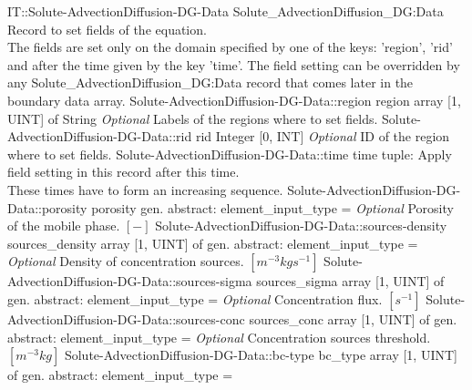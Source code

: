\begin{RecordType}
	{IT::Solute-AdvectionDiffusion-DG-Data}
	{Solute{\_}AdvectionDiffusion{\_}DG:Data}
	{}%
	{}%
	{{{Record to set fields of the equation.}\\{
The fields are set only on the domain specified by one of the keys: 'region', 'rid'}\\{
and after the time given by the key 'time'. The field setting can be overridden by}\\{
 any Solute{\_}AdvectionDiffusion{\_}DG:Data record that comes later in the boundary data array.}%
}}
		\RecKey
			{Solute-AdvectionDiffusion-DG-Data::region}
			{region}
			{{array [1, UINT] of }{String}}{}
			{ \it{Optional}}
			{{{Labels of the regions where to set fields. }%
}}
		\RecKey
			{Solute-AdvectionDiffusion-DG-Data::rid}
			{rid}
			{{Integer [0, INT]}}{}
			{ \it{Optional}}
			{{{ID of the region where to set fields.}%
}}
		\RecKey
			{Solute-AdvectionDiffusion-DG-Data::time}
			{time}
			{{tuple: }}{}
			{ }
			{{{Apply field setting in this record after this time.}\\{
These times have to form an increasing sequence.}%
}}
		\RecKey
			{Solute-AdvectionDiffusion-DG-Data::porosity}
			{porosity}
			{{gen. abstract: }}{{element{\_}input{\_}type}{ = }}
			{ \it{Optional}}
			{{{Porosity of the mobile phase. }{$[-]$}%
}}
		\RecKey
			{Solute-AdvectionDiffusion-DG-Data::sources-density}
			{sources{\_}density}
			{{array [1, UINT] of }{gen. abstract: }}{{element{\_}input{\_}type}{ = }}
			{ \it{Optional}}
			{{{Density of concentration sources. }{$[m^{-3}kgs^{-1}]$}%
}}
		\RecKey
			{Solute-AdvectionDiffusion-DG-Data::sources-sigma}
			{sources{\_}sigma}
			{{array [1, UINT] of }{gen. abstract: }}{{element{\_}input{\_}type}{ = }}
			{ \it{Optional}}
			{{{Concentration flux. }{$[s^{-1}]$}%
}}
		\RecKey
			{Solute-AdvectionDiffusion-DG-Data::sources-conc}
			{sources{\_}conc}
			{{array [1, UINT] of }{gen. abstract: }}{{element{\_}input{\_}type}{ = }}
			{ \it{Optional}}
			{{{Concentration sources threshold. }{$[m^{-3}kg]$}%
}}
		\RecKey
			{Solute-AdvectionDiffusion-DG-Data::bc-type}
			{bc{\_}type}
			{{array [1, UINT] of }{gen. abstract: }}{{element{\_}input{\_}type}{ = }}

\end{RecordType}
